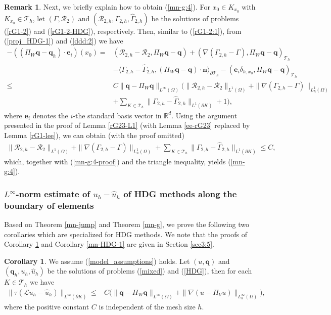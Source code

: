 \documentclass[1996/10/24]{amsart}
\theoremstyle{definition}
\newtheorem{remark}[theorem]{Remark}
\newtheorem{corollary}[theorem]{Corollary}
\numberwithin{equation}{section}
\begin{document}
\begin{remark}
Next, we briefly explain how to obtain (\ref{mn-g:4}). For $x_0\in K_{x_0}$ with $K_{x_0}\in\mathcal{T}_h$, let $(\Gamma,\boldsymbol{\mathcal{R}}_2)$
and $(\boldsymbol{\mathcal{R}}_{2,h},\Gamma_{2,h},\widehat{\Gamma}_{2,h})$ be the solutions of problems (\ref{rG1-2}) and (\ref{rG1-2-HDG}), respectively.
Then, similar to (\ref{rG1-2:1}), from (\ref{proj_HDG-1}) and (\ref{ddd:2}) we have
\begin{align}
-((\Pi_W{\bm q}-{\bm q}_h)\cdot{\bm e}_i)(x_0)=&(\boldsymbol{\mathcal{R}}_{2,h}-\boldsymbol{\mathcal{R}}_2,\Pi_W{\bm q}-{\bm q})+(\nabla(\Gamma_{2,h}-\Gamma),
\Pi_W{\bm q}-{\bm q})_{\mathcal{T}_h}\nonumber\\
&-\langle\Gamma_{2,h}-\widehat{\Gamma}_{2,h},(\Pi_W{\bm q}-{\bm q})\cdot{\bm n}\rangle_{\partial\mathcal{T}_h}-({\bm e}_i\delta_{h,x_0},\Pi_W{\bm q}-{\bm q})
_{\mathcal{T}_h}\label{mn-g:4-proof}\\
\leq&C\|{\bm q}-\Pi_W{\bm q}\|_{L^{\infty}(\Omega)}\Big(\|\boldsymbol{\mathcal{R}}_{2,h}-\boldsymbol{\mathcal{R}}_2\|_{L^1(\Omega)}+
\|\nabla(\Gamma_{2,h}-\Gamma)\|_{L_h^1(\Omega)}\nonumber\\
&+\sum_{K\in\mathcal{T}_h}\|\Gamma_{2,h}-\widehat{\Gamma}_{2,h}\|_{L^1(\partial K)}+1\Big),\nonumber
\end{align}
where ${\bm e}_i$ denotes the $i$-the standard basis vector in $\mathbb{R}^d$. Using the argument presented in the proof of Lemma \ref{rG23-L1} (with Lemma \ref{ee-rG23} replaced by Lemma \ref{rG1-lee}), we can obtain (with the proof omitted)
\begin{align*}
\|\boldsymbol{\mathcal{R}}_{2,h}-\boldsymbol{\mathcal{R}}_2\|_{L^1(\Omega)}+
\|\nabla(\Gamma_{2,h}-\Gamma)\|_{L_h^1(\Omega)}+\sum_{K\in\mathcal{T}_h}\|\Gamma_{2,h}-\widehat{\Gamma}_{2,h}\|_{L^1(\partial K)}\leq C,
\end{align*}
which, together with (\ref{mn-g:4-proof}) and the triangle inequality, yields (\ref{mn-g:4}).
\end{remark}

\subsubsection{$L^{\infty}$-norm estimate of $u_{h} - \widehat{u}_{h}$ of HDG methods along the boundary of elements}

Based on Theorem \ref{mn-jump} and Theorem \ref{mn-g}, we prove the following two corollaries which are specialized for HDG methods. We note that the proofs
of Corollary \ref{mn-HDG} and Corollary \ref{mn-HDG-1} are given in Section \ref{sec3:5}.
\begin{corollary}\label{mn-HDG}
We assume (\ref{model_assumptions}) holds.
Let $(u,{\bm q})$ and $({\bm q}_h,u_h,\widehat{u}_h)$ be the solutions of problems (\ref{mixed}) and (\ref{HDG}), then for each $K\in\mathcal{T}_h$ we have
\begin{align}
\|\tau(\mathcal{L}u_h-\widehat{u}_h)\|_{L^{\infty}(\partial K)}\leq& C\Big(\|{\bm q}-\Pi_W{\bm q}\|_{L^{\infty}(\Omega)}
+\|\nabla(u-\Pi_Vu)\|_{L_h^{\infty}(\Omega)}\Big),\label{mn-HDG:1}
\end{align}
where the positive constant $C$ is independent of the mesh size $h$.
\end{corollary}
\end{document}
